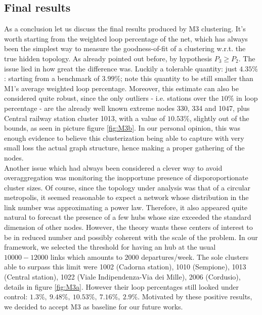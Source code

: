 \documentclass[11pt,twoside]{report}
\begin{document}
\subsection{Final results}
As a conclusion let us discuss the final results produced by M3 clustering. It's worth starting from the weighted loop percentage of the net, which has always been the simplest way to measure the goodness-of-fit of a clustering w.r.t. the true hidden topology. As already pointed out before, by hypothesis $ P_3\geq P_2 $. The issue lied in how great the difference was. Luckily a tolerable quantity: just $ 4.35\% $: starting from a benchmark of $ 3.99\% $; note this quantity to be still smaller than M1's average weighted loop percentage. Moreover, this estimate can also be considered quite robust, since the only outliers - i.e. stations over the $ 10\% $ in loop percentage - are the already well known extreme nodes 330, 334 and 1047, plus Central railway station cluster 1013, with a value of $ 10.53\% $, slightly out of the bounds, as seen in picture  figure \ref{fig:M3b}. In our personal opinion, this was enough evidence to believe this clusterization being able to capture with very small loss the actual graph structure, hence making a proper gathering of the nodes.\\
Another issue which had always been considered a clever way to avoid overaggregation was monitoring the inopportune presence of disporoportionate cluster sizes. Of course, since the topology under analysis was that of a circular metropolis, it seemed reasonable to expect a network whose distribution in the link number was approximating a power law. Therefore, it also appeared quite natural to forecast the presence of a few hubs whose size exceeded the standard dimension of other nodes. However, the theory wants these centers of interest to be in reduced number and possibly coherent with the scale of the problem. In our framework, we selected the threshold for having an hub at the usual $ 10000-12000 $ links which amounts to $ 2000 $ departures/week. The sole clusters able to surpass this limit were 1002 (Cadorna station), 1010 (Sempione), 1013 (Central station), 1022 (Viale Indipendenza-Via dei Mille), 2006 (Cordusio), details in figure \ref{fig:M3a}. However their loop percentages still looked under control: $ 1.3\%,\ 9.48\%,\ 10.53\%,\ 7.16\%,\ 2.9\% $. Motivated by these positive results, we decided to accept M3 as baseline for our future works.
\end{document}
